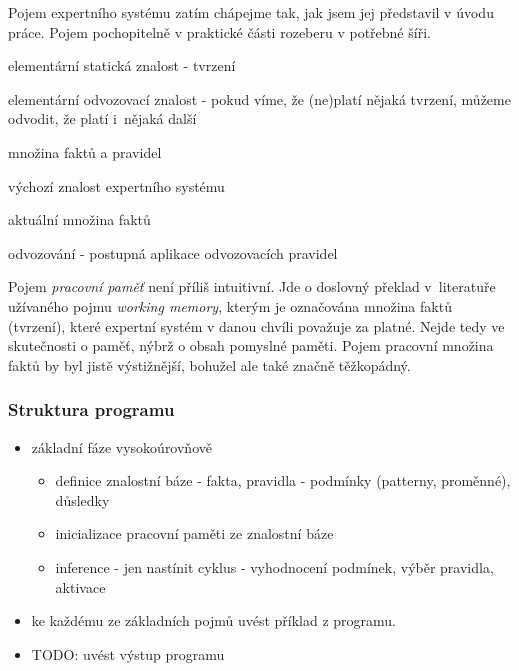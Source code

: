 Pojem expertního systému zatím chápejme tak, jak jsem jej představil v úvodu
práce. Pojem pochopitelně v praktické části rozeberu v potřebné šíři.
\begin{description}[leftmargin=6cm,style=sameline,align=right,labelsep=0.5cm]
  \item[fakt] elementární statická znalost - tvrzení
  \item[(odvozovací) pravidlo] elementární odvozovací znalost - pokud víme, že
    (ne)platí nějaká tvrzení, můžeme odvodit, že platí i~nějaká další
  \item[znalost (v ExiLu)] množina faktů a pravidel
  \item[znalostní báze] výchozí znalost expertního systému
  \item[pracovní paměť] aktuální množina faktů
  \item[inference] odvozování - postupná aplikace odvozovacích pravidel
\end{description}
Pojem \emph{pracovní paměť} není příliš intuitivní. Jde o doslovný překlad
v~literatuře užívaného pojmu \emph{working memory}, kterým je označována množina
faktů (tvrzení), které expertní systém v danou chvíli považuje za platné. Nejde
tedy ve skutečnosti o paměť, nýbrž o obsah pomyslné paměti. Pojem pracovní
množina faktů by byl jistě výstižnější, bohužel ale také značně těžkopádný.


\subsubsection{Struktura programu}

\begin{framed}
  \begin{itemize}
    \item základní fáze vysokoúrovňově
    \begin{itemize}
      \item definice znalostní báze - fakta, pravidla - podmínky (patterny,
        proměnné), důsledky
      \item inicializace pracovní paměti ze znalostní báze
      \item inference - jen nastínit cyklus - vyhodnocení podmínek, výběr pravidla,
        aktivace
    \end{itemize}
    \item ke každému ze základních pojmů uvést příklad z programu.
    \item TODO: uvést výstup programu
  \end{itemize}
\end{framed}

